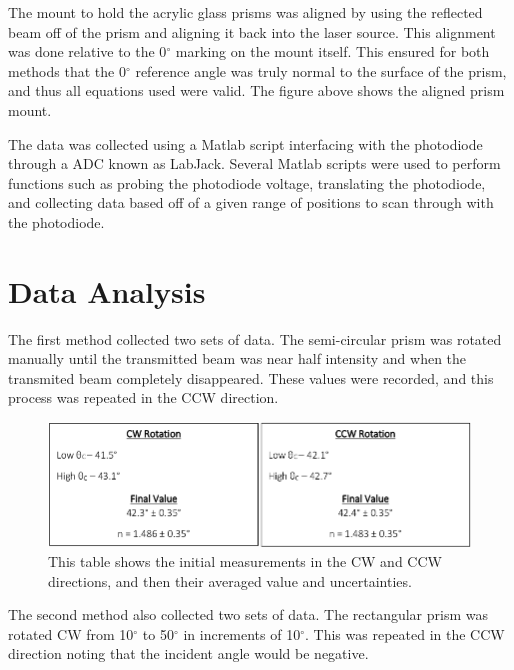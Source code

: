 \documentclass[colorlinks=true,pdfstartview=FitV,linkcolor=blue,
            citecolor=red,urlcolor=magenta]{basedoc}
\begin{document}
  The mount to hold the acrylic glass prisms was aligned by using the reflected beam off of the prism and aligning it back into the laser source. This alignment was done relative to the 0$^{\circ}$ marking on the mount itself. This ensured for both methods that the 0$^{\circ}$ reference angle was truly normal to the surface of the prism, and thus all equations used were valid. The figure above shows the aligned prism mount.

  The data was collected using a Matlab script interfacing with the photodiode through a ADC known as LabJack. Several Matlab scripts were used to perform functions such as probing the photodiode voltage, translating the photodiode, and collecting data based off of a given range of positions to scan through with the photodiode.

\pagebreak
\section{Data Analysis}
  The first method collected two sets of data. The semi-circular prism was rotated manually until the transmitted beam was near half intensity and when the transmited beam completely disappeared. These values were recorded, and this process was repeated in the CCW direction.

  \begin{figure}[!h]
    \begin{center}
    \includegraphics[width=5in]{resources/partA_data_table.png}
    \caption{This table shows the initial measurements in the CW and CCW directions, and then their averaged value and uncertainties.}
    \label{fig:partA_data_table}
    \end{center}
  \end{figure}

  The second method also collected two sets of data. The rectangular prism was rotated CW from 10$^{\circ}$ to 50$^{\circ}$ in increments of 10$^{\circ}$. This was repeated in the CCW direction noting that the incident angle would be negative.
\end{document}
